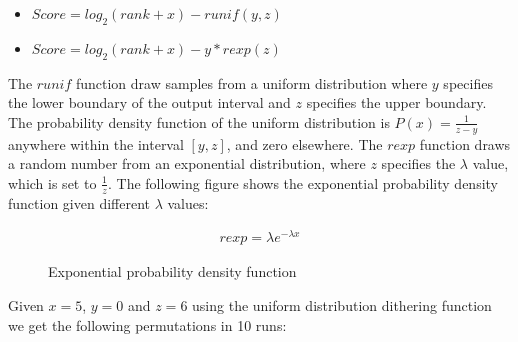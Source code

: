 \begin{itemize}
\item $Score = log_2(rank+x) - runif(y, z)$
\item $Score = log_2(rank+x) - y*rexp(z)$
\end{itemize}

The $runif$ function draw samples from a uniform distribution where $y$ specifies the lower boundary
of the output interval and $z$ specifies the upper boundary. The probability density function of the
uniform distribution is $P(x) = \frac{1}{z-y}$ anywhere within the interval $[y, z]$, and zero elsewhere.
The $rexp$ function draws a random number from an exponential distribution, where $z$ specifies the
$\lambda$ value, which is set to $\frac{1}{z}$. The following figure shows the exponential probability
density function given different $\lambda$ values:

\begin{figure}[H]
\label{fig:expdist}
  \centering
  \noindent\begin{minipage}{.45\textwidth}
    \end{minipage}
    \begin{minipage}{.45\textwidth}
      \begin{align}
        \label{exponential propability density function}
        rexp = \lambda e^{-\lambda x}
      \end{align}
      \end{minipage}
    \caption{Exponential probability density function}
\end{figure}


Given $x=5$, $y=0$ and $z=6$ using the uniform distribution dithering function we get the following
permutations in 10 runs:


